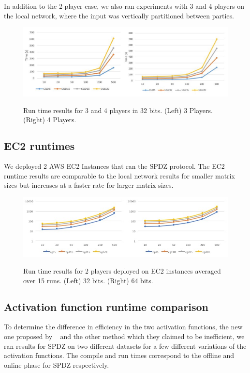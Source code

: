 \documentclass{article}
\begin{document}
In addition to the 2 player case, we also ran experiments with 3 and 4 players on the local network, where the input was vertically partitioned between parties.

\begin{figure}[h]
\centering
  \caption{Run time results for 3 and 4 players in 32 bits. (Left) 3 Players. (Right) 4 Players. }

  \includegraphics[scale=0.6]{multi.jpg}
  \label{fig:result3}
\end{figure}

\subsection{EC2 runtimes}

We deployed 2 AWS EC2 Instances that ran the SPDZ protocol. The EC2 runtime results are comparable to the local network results for smaller matrix sizes but increases at a faster rate for larger matrix sizes.

\begin{figure}[h]
\centering
  \caption{Run time results for 2 players deployed on EC2 instances averaged over 15 runs. (Left) 32 bits. (Right) 64 bits.}
  \includegraphics[scale=0.7]{ec2.jpg}
  \label{fig:result4}
\end{figure}

\subsection{Activation function runtime comparison}

To determine the difference in efficiency in the two activation functions, the new one proposed by ~\cite{MZ17} and the other method which they claimed to be inefficient, we ran results for SPDZ on two different datasets for a few different variations of the activation functions. The compile and run times correspond to the offline and online phase for SPDZ respectively.
\end{document}
